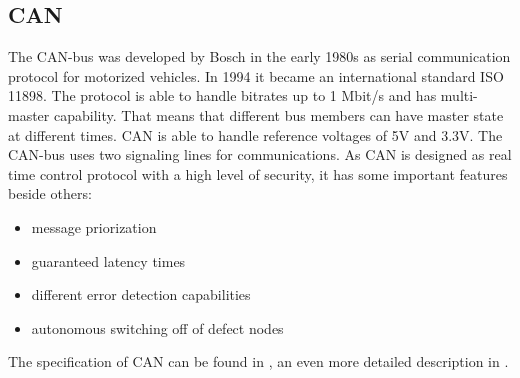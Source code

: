 \subsection{CAN}
The CAN-bus was developed by Bosch in the early 1980s as serial communication protocol for motorized vehicles. In 1994 it became an international standard ISO 11898. The protocol is able to handle bitrates up to 1 Mbit/s and has multi-master capability. That means that different bus members can have master state at different times. CAN is able to handle reference voltages of 5V and 3.3V.\cite{Corrig2008} The CAN-bus uses two signaling lines for communications. As CAN is designed as real time control protocol with a high level of security, it has some important features beside others\cite{boschcan91}:
\begin{itemize}
\item message priorization
\item guaranteed latency times
\item different error detection capabilities
\item autonomous switching off of defect nodes
\end{itemize}
The specification of CAN can be found in \cite{boschcan91}, an even more detailed description in \cite{nxpcan98}.